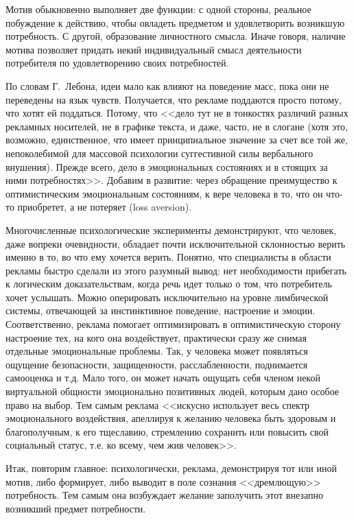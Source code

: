 Мотив обыкновенно выполняет две функции: с одной стороны, реальное побуждение
к действию, чтобы овладеть предметом и удовлетворить возникшую потребность.
С другой, образование личностного смысла. Иначе говоря, наличие мотива
позволяет придать некий индивидуальный смысл деятельности потребителя по
удовлетворению своих потребностей.

По словам Г.~Лебона, идеи мало как влияют на поведение масс, пока они не переведены
на язык чувств. Получается, что рекламе поддаются просто потому, что хотят
ей поддаться. Потому, что <<дело тут не в тонкостях различий разных рекламных
носителей, не в графике текста, и даже, часто, не в слогане (хотя это,
возможно, единственное, что имеет принципиальное значение за счет все той же,
непоколебимой для массовой психологии суггестивной силы вербального внушения).
Прежде всего, дело в эмоциональных состояниях и в стоящих за ними потребностях>>.\autocite[][315]{book:olshansky}
Добавим в развитие: через обращение преимущество к оптимистическим эмоциональным
состояниям, к вере человека в то, что он что-то приобретет, а не потеряет
(loss aversion).

Многочисленные психологические эксперименты демонстрируют, что человек,
даже вопреки очевидности, обладает почти исключительной склонностью верить
именно в то, во что ему хочется верить. Понятно, что специалисты в области
рекламы быстро сделали из этого разумный вывод: нет необходимости прибегать
к логическим доказательствам, когда речь идет только о том, что потребитель
хочет услышать. Можно оперировать исключительно на уровне лимбической системы,
отвечающей за инстинктивное поведение, настроение и эмоции. Соответственно,
реклама помогает оптимизировать в оптимистическую сторону настроение тех,
на кого она воздействует, практически сразу же снимая отдельные эмоциональные
проблемы. Так, у человека может появляться ощущение безопасности, защищенности,
расслабленности, поднимается самооценка и т.д. Мало того, он может начать
ощущать себя членом некой виртуальной общности эмоционально позитивных людей,
которым дано особое право на выбор.
\autocite{ariely2009predictably}\autocite{dittrich2008upside}\autocite{martin2012}\autocite{lindstrom2010}
Тем самым реклама <<искусно использует весь спектр эмоционального воздействия,
апеллируя к желанию человека быть здоровым и благополучным, к его тщеславию,
стремлению сохранить или повысить свой социальный статус, т.е. ко всему, чем
жив человек>>.\autocite{feofanov1987}

Итак, повторим главное: психологически, реклама, демонстрируя тот или иной мотив,
либо формирует, либо выводит в поле сознания <<дремлющую>> потребность.
Тем самым она возбуждает желание заполучить этот внезапно возникший предмет
потребности.

